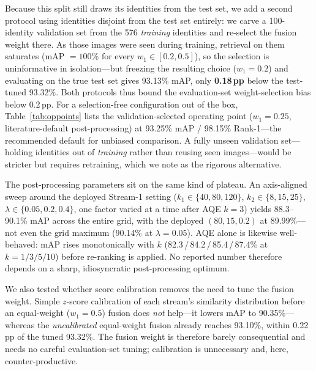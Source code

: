 \documentclass[10pt,a4paper]{article}
\begin{document}
Because this split still draws its identities from the test set, we add a
second protocol using identities disjoint from the test set entirely: we carve
a 100-identity validation set from the 576 \emph{training} identities and
re-select the fusion weight there. As those images were seen during training,
retrieval on them saturates (mAP $=100\%$ for every $w_1\in[0.2,0.5]$), so the
selection is uninformative in isolation---but freezing the resulting choice
($w_1{=}0.2$) and evaluating on the true test set gives 93.13\% mAP, only
\textbf{0.18\,pp} below the test-tuned 93.32\%. Both protocols thus bound the
evaluation-set weight-selection bias below 0.2\,pp. For a selection-free
configuration out of the box, Table~\ref{tab:oppoints} lists the
validation-selected operating point ($w_1{=}0.25$, literature-default
post-processing) at 93.25\% mAP / 98.15\% Rank-1---the recommended default for
unbiased comparison. A fully unseen validation set---holding identities out of
\emph{training} rather than reusing seen images---would be stricter but
requires retraining, which we note as the rigorous alternative.

The post-processing parameters sit on the same kind of plateau. An
axis-aligned sweep around the deployed Stream-1 setting
($k_1\in\{40,80,120\}$, $k_2\in\{8,15,25\}$, $\lambda\in\{0.05,0.2,0.4\}$, one
factor varied at a time after AQE $k{=}3$) yields 88.3--90.1\% mAP across the
entire grid, with the deployed $(80,15,0.2)$ at 89.99\%---not even the grid
maximum (90.14\% at $\lambda{=}0.05$). AQE alone is likewise well-behaved: mAP
rises monotonically with $k$ (82.3\,/\,84.2\,/\,85.4\,/\,87.4\% at
$k{=}1/3/5/10$) before re-ranking is applied. No reported number therefore
depends on a sharp, idiosyncratic post-processing optimum.

We also tested whether score calibration removes the need to tune the fusion
weight. Simple $z$-score calibration of each stream's similarity distribution
before an equal-weight ($w_1{=}0.5$) fusion does \emph{not} help---it lowers
mAP to 90.35\%---whereas the \emph{uncalibrated} equal-weight fusion already
reaches 93.10\%, within 0.22\,pp of the tuned 93.32\%. The fusion weight is
therefore barely consequential and needs no careful evaluation-set tuning;
calibration is unnecessary and, here, counter-productive.
\end{document}
